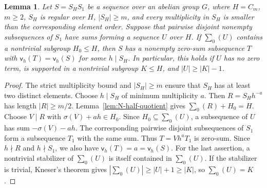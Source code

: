 \documentclass[10pt,a4paper]{amsart}
\newtheorem{lem}[thm]{Lemma}
\theoremstyle{definition}
\theoremstyle{remark}
\numberwithin{equation}{section}
\begin{document}
\begin{lem}\label{lem:N-kernel-blocks}
Let $S=S_HS_1$ be a sequence over an abelian group $G$, where
$H=C_m$, $m\ge2$, $S_H$ is regular over $H$, $|S_H|\ge m$,
and every multiplicity in $S_H$ is smaller than the corresponding element order.
Suppose that pairwise disjoint nonempty subsequences of $S_1$ have sums
forming a sequence $U$ over $H$.
If $\sum_0(U)$ contains a nontrivial subgroup $H_0\le H$, then $S$
has a nonempty zero-sum subsequence $T$ with
$\mathsf v_h(T)=\mathsf v_h(S)$ for some $h\mid S_H$.
In particular, this holds if $U$ has no zero term, is supported in a
nontrivial subgroup $K\le H$, and $|U|\ge|K|-1$.
\end{lem}
\begin{proof}
The strict multiplicity bound and $|S_H|\ge m$ ensure that $S_H$
has at least two distinct elements. Choose $h\mid S_H$ of minimum multiplicity $a$. Then $R=S_Hh^{-a}$ has length $|R|\ge m/2$.
Lemma~\ref{lem:N-half-quotient} gives $\sum_0(R)+H_0=H$.
Choose $V\mid R$ with $\sigma(V)+ah\in H_0$.
Since $H_0\subseteq\sum_0(U)$, a subsequence of $U$ has sum
$-\sigma(V)-ah$. The corresponding pairwise disjoint subsequences of
$S_1$ form a subsequence $T_1$ with the same sum.
Thus $T=Vh^aT_1$ is zero-sum. Since $h\nmid R$ and $h\nmid S_1$,
we also have $\mathsf v_h(T)=a=\mathsf v_h(S)$.
For the last assertion, a nontrivial stabilizer of $\sum_0(U)$
is itself contained in $\sum_0(U)$.
If the stabilizer is trivial, Kneser's theorem gives
$|\sum_0(U)|\ge|U|+1\ge|K|$, so $\sum_0(U)=K$.
\end{proof}
\end{document}
